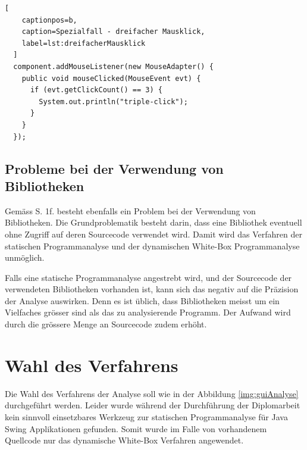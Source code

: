   \begin{lstlisting}[
    captionpos=b,
    caption=Spezialfall - dreifacher Mausklick,
    label=lst:dreifacherMausklick
  ]
  component.addMouseListener(new MouseAdapter() {
    public void mouseClicked(MouseEvent evt) {
      if (evt.getClickCount() == 3) {
        System.out.println("triple-click");
      }
    }
  });
  \end{lstlisting}
  
  \subsection{Probleme bei der Verwendung von Bibliotheken}
  
  Gemäss \cite{GUIAnalysenUndBibliotheken} S. 1f. besteht ebenfalls ein Problem
  bei der Verwendung von Bibliotheken. Die Grundproblematik besteht darin,
  dass eine Bibliothek eventuell ohne Zugriff auf deren Sourcecode verwendet
  wird. Damit wird das Verfahren der statischen Programmanalyse und der
  dynamischen White-Box Programmanalyse unmöglich.
  
  Falls eine statische Programmanalyse angestrebt wird, und der Sourcecode der
  verwendeten Bibliotheken vorhanden ist, kann sich das negativ auf die
  Präzision der Analyse auswirken. Denn es ist üblich, dass Bibliotheken
  meisst um ein Vielfaches grösser sind als das zu analysierende Programm. Der
  Aufwand wird durch die grössere Menge an Sourcecode zudem erhöht.
  
  \section{Wahl des Verfahrens}
  
  Die Wahl des Verfahrens der Analyse soll wie in der Abbildung
  \ref{img:guiAnalyse} durchgeführt werden. Leider wurde während der
  Durchführung der Diplomarbeit kein sinnvoll einsetzbares Werkzeug zur
  statischen Programmanalyse für Java Swing Applikationen gefunden. Somit wurde
  im Falle von vorhandenem Quellcode nur das dynamische White-Box Verfahren
  angewendet.
  
  
